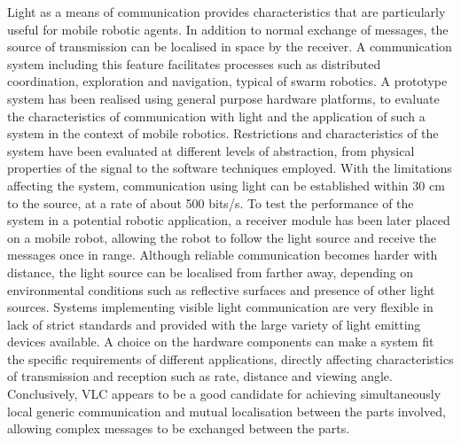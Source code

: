 Light as a means of communication provides characteristics that are particularly useful for mobile robotic agents.
In addition to normal exchange of messages, the source of transmission can be localised in space by the receiver.
A communication system including this feature facilitates processes such as distributed coordination, exploration and navigation, typical of swarm robotics.
A prototype system has been realised using general purpose hardware platforms, to evaluate the characteristics of communication with light and the application of such a system in the context of mobile robotics.
Restrictions and characteristics of the system have been evaluated at different levels of abstraction, from physical properties of the signal to the software techniques employed.
With the limitations affecting the system, communication using light can be established within 30 cm to the source, at a rate of about 500 bits/s.
To test the performance of the system in a potential robotic application, a receiver module has been later placed on a mobile robot, allowing the robot to follow the light source and receive the messages once in range.
Although reliable communication becomes harder with distance, the light source can be localised from farther away, depending on environmental conditions such as reflective surfaces and presence of other light sources.
Systems implementing visible light communication are very flexible in lack of strict standards and provided with the large variety of light emitting devices available.
A choice on the hardware components can make a system fit the specific requirements of different applications, directly affecting characteristics of transmission and reception such as rate, distance and viewing angle.
Conclusively, VLC appears to be a good candidate for achieving simultaneously local generic communication and mutual localisation between the parts involved, allowing complex messages to be exchanged between the parts.